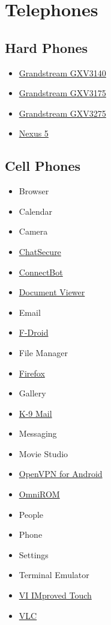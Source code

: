 \section{Telephones}
\subsection{Hard Phones}
\begin{itemize}
\item \href{https://www.grandstream.com/products/ip-video-telephony/gxv3140/}{Grandstream GXV3140}
\item \href{https://www.grandstream.com/products/ip-video-telephony/gxv3175/}{Grandstream GXV3175}
\item \href{https://www.grandstream.com/products/ip-video-telephony/gxv3275/}{Grandstream GXV3275}
\item \href{http://www.google.com/nexus/5/}{Nexus 5}
\end{itemize}

\subsection{Cell Phones}
\begin{itemize}
\item Browser
\item Calendar
\item Camera
\item \href{https://chatsecure.org/}{ChatSecure}
\item \href{http://code.google.com/p/connectbot/}{ConnectBot}
\item \href{https://github.com/dschuermann/document-viewer}{Document Viewer}
\item Email
\item \href{https://f-droid.org/}{F-Droid}
\item File Manager
\item \href{http://www.mozilla.org/en-US/firefox/}{Firefox}
\item Gallery
\item \href{http://code.google.com/p/k9mail/}{K-9 Mail}
\item Messaging
\item Movie Studio
\item \href{https://code.google.com/p/ics-openvpn/}{OpenVPN for Android}
\item \href{https://omnirom.org/}{OmniROM}
\item People
\item Phone
\item Settings
\item Terminal Emulator
\item \href{https://github.com/momodalo/vimtouch}{VI IMproved Touch}
\item \href{http://www.videolan.org/vlc/download-android.html}{VLC}
\end{itemize}

